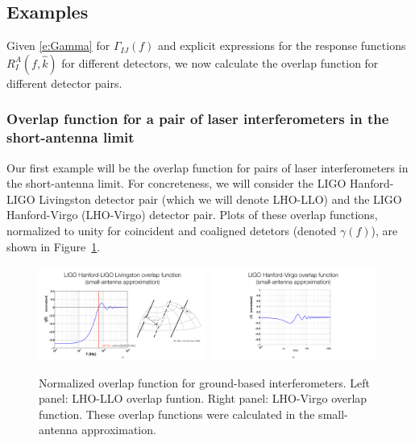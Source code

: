 \subsection{Examples}

Given \eqref{e:Gamma} for $\Gamma_{IJ}(f)$ and 
explicit expressions for the response functions 
$R^A_I(f,\hat k)$ for different detectors, we now
calculate the overlap function for different 
detector pairs.

\subsubsection{Overlap function for a pair of laser
interferometers in the short-antenna limit}

Our first example will be the overlap function 
for pairs of laser interferometers in the short-antenna
limit.
For concreteness, we will consider the 
LIGO Hanford-LIGO Livingston detector pair (which we will
denote LHO-LLO)
and the LIGO Hanford-Virgo (LHO-Virgo) detector pair.
Plots of these overlap functions, normalized to unity
for coincident and coaligned detetors 
(denoted $\gamma(f)$), are shown in Figure~\ref{f:orfs}.
%
\begin{figure}[htbp!]
\begin{center}
\includegraphics[width=0.49\textwidth]{Figures/LHO-LLO-orf}
\includegraphics[width=0.49\textwidth]{Figures/LHO-Virgo-orf}
\caption{Normalized overlap function for ground-based
interferometers.
Left panel: LHO-LLO overlap funtion.
Right panel: LHO-Virgo overlap function.
These overlap functions were calculated in the small-antenna
approximation.}
\label{f:orfs}
\end{center}
\end{figure}

